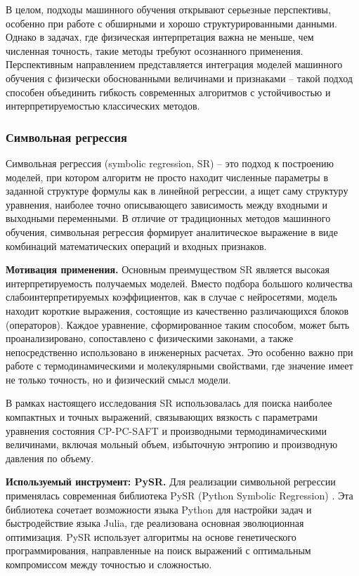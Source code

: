 \documentclass[a4paper,12pt]{article}
\begin{document}
      В целом, подходы машинного обучения открывают серьезные перспективы, особенно при работе с обширными и хорошо структурированными данными. Однако в задачах, где физическая интерпретация важна не меньше, чем численная точность, такие методы требуют осознанного применения. Перспективным направлением представляется интеграция моделей машинного обучения с физически обоснованными величинами и признаками -- такой подход способен объединить гибкость современных алгоритмов с устойчивостью и интерпретируемостью классических методов.

\subsubsection{Символьная регрессия}

Символьная регрессия (symbolic regression, SR) -- это подход к построению моделей, при котором алгоритм не просто находит численные параметры в заданной структуре формулы как в линейной регрессии, а ищет саму структуру уравнения, наиболее точно описывающего зависимость между входными и выходными переменными. В отличие от традиционных методов машинного обучения, символьная регрессия формирует аналитическое выражение в виде комбинаций математических операций и входных признаков.

\textbf{Мотивация применения.}
Основным преимуществом SR является высокая интерпретируемость получаемых моделей. Вместо подбора большого количества слабоинтерпретируемых коэффициентов, как в случае с нейросетями, модель находит короткие выражения, состоящие из качественно различающихся блоков (операторов). Каждое уравнение, сформированное таким способом, может быть проанализировано, сопоставлено с физическими законами, а также непосредственно использовано в инженерных расчетах. Это особенно важно при работе с термодинамическими и молекулярными свойствами, где значение имеет не только точность, но и физический смысл модели.

В рамках настоящего исследования SR использовалась для поиска наиболее компактных и точных выражений, связывающих вязкость с параметрами уравнения состояния CP-PC-SAFT и производными термодинамическими величинами, включая мольный объем, избыточную энтропию и производную давления по объему.

\textbf{Используемый инструмент: PySR.}
Для реализации символьной регрессии применялась современная библиотека PySR (Python Symbolic Regression) \cite{cranmer2023pysr}. Эта библиотека сочетает возможности языка Python для настройки задач и быстродействие языка Julia, где реализована основная эволюционная оптимизация. PySR использует алгоритмы на основе генетического программирования, направленные на поиск выражений с оптимальным компромиссом между точностью и сложностью.
\end{document}
